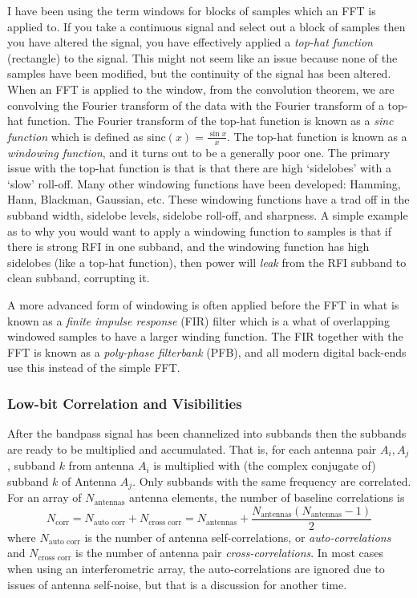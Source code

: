 \documentclass[usenatbib,usegraphicx]{article}
\begin{document}
I have been using the term windows for blocks of samples which an FFT is applied to.
If you take a continuous signal and select out a block of samples then you have altered the signal, you have effectively applied a \emph{top-hat function} (rectangle) to the signal.
This might not seem like an issue because none of the samples have been modified, but the continuity of the signal has been altered.
When an FFT is applied to the window, from the convolution theorem, we are convolving the Fourier transform of the data with the Fourier transform of a top-hat function.
The Fourier transform of the top-hat function is known as a \emph{sinc function} which is defined as $\textrm{sinc}(x) = \frac{\sin x}{x}$.
The top-hat function is known as a \emph{windowing function}, and it turns out to be a generally poor one.
The primary issue with the top-hat function is that is that there are high `sidelobes' with a `slow' roll-off.
Many other windowing functions have been developed: Hamming, Hann, Blackman, Gaussian, etc.
These windowing functions have a trad off in the subband width, sidelobe levels, sidelobe roll-off, and sharpness.
A simple example as to why you would want to apply a windowing function to samples is that if there is strong RFI in one subband, and the windowing function has high sidelobes (like a top-hat function), then power will \emph{leak} from the RFI subband to clean subband, corrupting it.

A more advanced form of windowing is often applied before the FFT in what is known as a \emph{finite impulse response} (FIR) filter which is a what of overlapping windowed samples to have a larger winding function.
The FIR together with the FFT is known as a \emph{poly-phase filterbank} (PFB), and all modern digital back-ends use this instead of the simple FFT.

\subsubsection{Low-bit Correlation and Visibilities}

After the bandpass signal has been channelized into subbands then the subbands are ready to be multiplied and accumulated.
That is, for each antenna pair $A_i, A_j$, subband $k$ from antenna $A_i$ is multiplied with (the complex conjugate of) subband $k$ of Antenna $A_j$.
Only subbands with the same frequency are correlated.
For an array of $N_{\textrm{antennas}}$ antenna elements, the number of baseline correlations is
%
\begin{equation}
\label{eq:baselines}
N_{\textrm{corr}} = N_{\textrm{auto corr}} + N_{\textrm{cross corr}} = N_{\textrm{antennas}} + \frac{N_{\textrm{antennas}} (N_{\textrm{antennas}}-1)}{2}
\end{equation}
%
where $N_{\textrm{auto corr}}$ is the number of antenna self-correlations, or \emph{auto-correlations} and $N_{\textrm{cross corr}}$ is the number of antenna pair \emph{cross-correlations}.
In most cases when using an interferometric array, the auto-correlations are ignored due to issues of antenna self-noise, but that is a discussion for another time.
\end{document}

